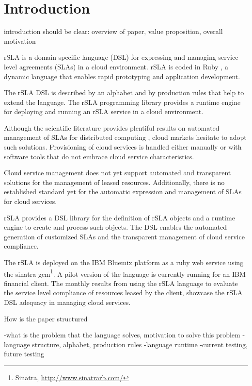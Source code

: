 \section{Introduction}\label{sec:introduction}


introduction should be clear: overview of paper, 
value proposition, overall motivation

rSLA is a domain specific language (DSL) for expressing and managing service level agreements (SLAs) in a cloud environment. rSLA is coded in Ruby \cite{ruby}, a dynamic language that enables rapid prototyping and application development. 

The rSLA DSL is described by an alphabet and by production rules that help to extend the language. The rSLA programming library provides a runtime engine for deploying and running an rSLA service in a cloud environment.

Although the scientific literature provides plentiful results on automated management of SLAs for distributed computing \cite{wsla, wsag}, cloud markets hesitate to adopt such solutions. Provisioning of cloud services is handled either manually or with software tools that do not embrace cloud service characteristics.

Cloud service management does not yet support automated and transparent solutions for the management of leased resources. Additionally, there is no established standard yet for the automatic expression and management of SLAs for cloud services.

rSLA provides a DSL library for the definition of rSLA objects and a runtime engine to create and process such objects. The DSL enables the automated generation of customized SLAs and the transparent management of cloud service compliance.

The rSLA is deployed on the IBM Bluemix platform \cite{bluemix} as a ruby web service using the sinatra gem\footnote{Sinatra, \url{http://www.sinatrarb.com/}}. A pilot version of the language is currently running for an IBM financial client. The monthly results from using the rSLA language to evaluate the service level compliance of resources leased by the client, showcase the rSLA DSL adequacy in managing cloud services.

How is the paper structured

-what is the problem that the language solves, motivation to solve this problem
-language structure, alphabet, production rules
-language runtime
-current testing, future testing